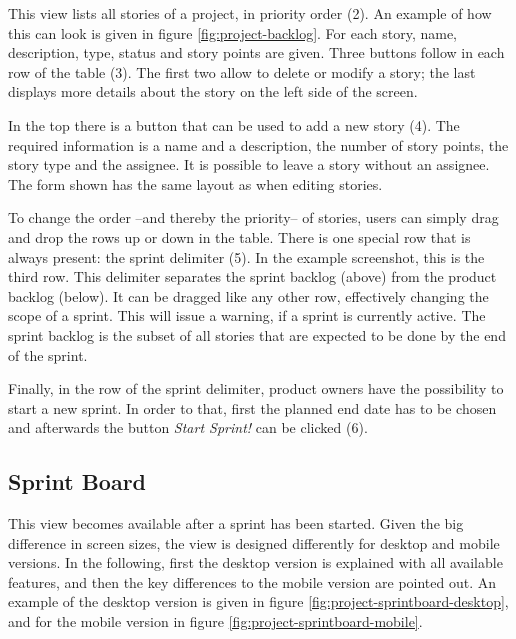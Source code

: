 \documentclass[
	accentcolor=tud1a %
]{tudreport}
\begin{document}
This view lists all stories of a project, in priority order (2). An example of how this can look is given in figure \ref{fig:project-backlog}. For each story, name, description, type, status and story points are given. Three buttons follow in each row of the table (3). The first two allow to delete or modify a story; the last displays more details about the story on the left side of the screen.

In the top there is a button that can be used to add a new story (4). The required information is a name and a description, the number of story points, the story type and the assignee. It is possible to leave a story without an assignee. The form shown has the same layout as when editing stories.

To change the order --and thereby the priority-- of stories, users can simply drag and drop the rows up or down in the table. There is one special row that is always present: the sprint delimiter (5). In the example screenshot, this is the third row. This delimiter separates the sprint backlog (above) from the product backlog (below). It can be dragged like any other row, effectively changing the scope of a sprint. This will issue a warning, if a sprint is currently active. The sprint backlog is the subset of all stories that are expected to be done by the end of the sprint.

Finally, in the row of the sprint delimiter, product owners have the possibility to start a new sprint. In order to that, first the planned end date has to be chosen and afterwards the button \emph{Start Sprint!} can be clicked (6).

\subsection{Sprint Board}
\label{sec:sprint-board}


This view becomes available after a sprint has been started. Given the big difference in screen sizes, the view is designed differently for desktop and mobile versions. In the following, first the desktop version is explained with all available features, and then the key differences to the mobile version are pointed out. An example of the desktop version is given in figure \ref{fig:project-sprintboard-desktop}, and for the mobile version in figure \ref{fig:project-sprintboard-mobile}.
\end{document}
